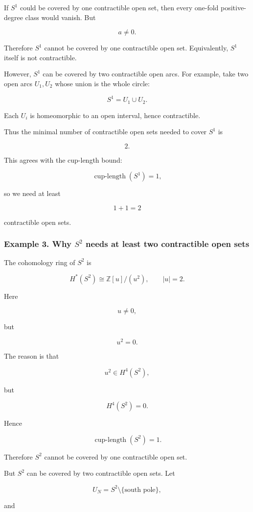 \documentclass[12pt,a4paper]{article}
\theoremstyle{notespace}
\begin{document}
If \(S^1\) could be covered by one contractible open set, then every one-fold positive-degree class would vanish. But

\[
a\neq 0.
\]

Therefore \(S^1\) cannot be covered by one contractible open set. Equivalently, \(S^1\) itself is not contractible.

However, \(S^1\) can be covered by two contractible open arcs. For example, take two open arcs \(U_1,U_2\) whose union is the whole circle:

\[
S^1=U_1\cup U_2.
\]

Each \(U_i\) is homeomorphic to an open interval, hence contractible.

Thus the minimal number of contractible open sets needed to cover \(S^1\) is

\[
\boxed{2.}
\]

This agrees with the cup-length bound:

\[
\operatorname{cup\text{-}length}(S^1)=1,
\]

so we need at least

\[
1+1=2
\]

contractible open sets.

\subsubsection{Example 3. Why \(S^2\) needs at least two contractible open sets}

The cohomology ring of \(S^2\) is

\[
H^*(S^2)
\cong
\mathbb Z[u]/(u^2),
\qquad
|u|=2.
\]

Here

\[
u\neq 0,
\]

but

\[
u^2=0.
\]

The reason is that

\[
u^2\in H^4(S^2),
\]

but

\[
H^4(S^2)=0.
\]

Hence

\[
\operatorname{cup\text{-}length}(S^2)=1.
\]

Therefore \(S^2\) cannot be covered by one contractible open set.

But \(S^2\) can be covered by two contractible open sets. Let

\[
U_N=S^2\setminus \{\text{south pole}\},
\]

and
\end{document}
